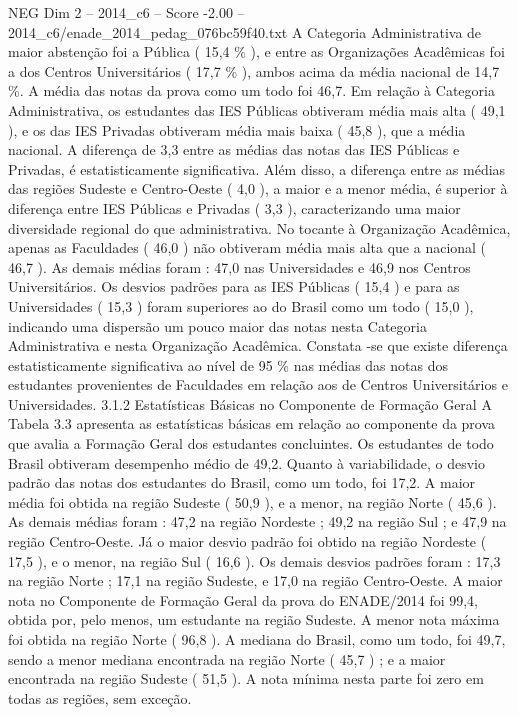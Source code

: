 \begin{textsample}{NEG Dim 2 – 2014\_c6 – Score -2.00 – 2014\_c6/enade\_2014\_pedag\_076bc59f40.txt}
A Categoria Administrativa de maior abstenção foi a Pública ( 15,4 \% ), e entre as Organizações Acadêmicas foi a dos Centros Universitários ( 17,7 \% ), ambos acima da média nacional de 14,7 \%.
A média das notas da prova como um todo foi 46,7.
Em relação à Categoria Administrativa, os estudantes das IES Públicas obtiveram média mais alta ( 49,1 ), e os das IES Privadas obtiveram média mais baixa ( 45,8 ), que a média nacional.
A diferença de 3,3 entre as médias das notas das IES Públicas e Privadas, é estatisticamente significativa.
Além disso, a diferença entre as médias das regiões Sudeste e Centro-Oeste ( 4,0 ), a maior e a menor média, é superior à diferença entre IES Públicas e Privadas ( 3,3 ), caracterizando uma maior diversidade regional do que administrativa.
No tocante à Organização Acadêmica, apenas as Faculdades ( 46,0 ) não obtiveram média mais alta que a nacional ( 46,7 ).
As demais médias foram : 47,0 nas Universidades e 46,9 nos Centros Universitários.
Os desvios padrões para as IES Públicas ( 15,4 ) e para as Universidades ( 15,3 ) foram superiores ao do Brasil como um todo ( 15,0 ), indicando uma dispersão um pouco maior das notas nesta Categoria Administrativa e nesta Organização Acadêmica.
Constata -se que existe diferença estatisticamente significativa ao nível de 95 \% nas médias das notas dos estudantes provenientes de Faculdades em relação aos de Centros Universitários e Universidades. 3.1.2 Estatísticas Básicas no Componente de Formação Geral A Tabela 3.3 apresenta as estatísticas básicas em relação ao componente da prova que avalia a Formação Geral dos estudantes concluintes.
Os estudantes de todo Brasil obtiveram desempenho médio de 49,2.
Quanto à variabilidade, o desvio padrão das notas dos estudantes do Brasil, como um todo, foi 17,2.
A maior média foi obtida na região Sudeste ( 50,9 ), e a menor, na região Norte ( 45,6 ).
As demais médias foram : 47,2 na região Nordeste ; 49,2 na região Sul ; e 47,9 na região Centro-Oeste.
Já o maior desvio padrão foi obtido na região Nordeste ( 17,5 ), e o menor, na região Sul ( 16,6 ).
Os demais desvios padrões foram : 17,3 na região Norte ; 17,1 na região Sudeste, e 17,0 na região Centro-Oeste.
A maior nota no Componente de Formação Geral da prova do ENADE/2014 foi 99,4, obtida por, pelo menos, um estudante na região Sudeste.
A menor nota máxima foi obtida na região Norte ( 96,8 ).
A mediana do Brasil, como um todo, foi 49,7, sendo a menor mediana encontrada na região Norte ( 45,7 ) ; e a maior encontrada na região Sudeste ( 51,5 ).
A nota mínima nesta parte foi zero em todas as regiões, sem exceção.

\end{textsample}
